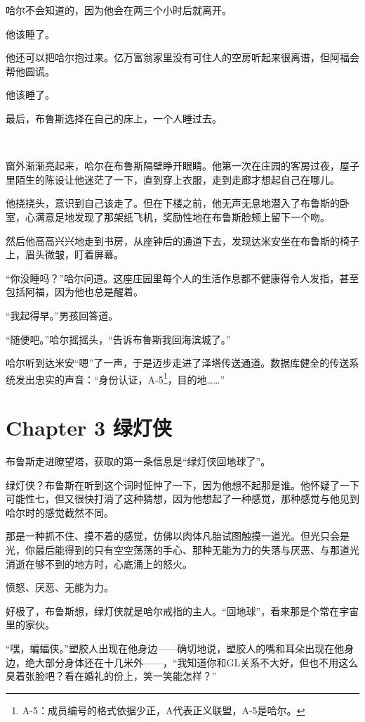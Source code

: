 \documentclass[../main.tex]{subfiles}
\begin{document}
哈尔不会知道的，因为他会在两三个小时后就离开。

他该睡了。

他还可以把哈尔抱过来。亿万富翁家里没有可住人的空房听起来很离谱，但阿福会帮他圆谎。

他该睡了。

最后，布鲁斯选择在自己的床上，一个人睡过去。

~\

窗外渐渐亮起来，哈尔在布鲁斯隔壁睁开眼睛。他第一次在庄园的客房过夜，屋子里陌生的陈设让他迷茫了一下，直到穿上衣服，走到走廊才想起自己在哪儿。

他挠挠头，意识到自己该走了。但在下楼之前，他无声无息地潜入了布鲁斯的卧室，心满意足地发现了那架纸飞机，奖励性地在布鲁斯脸颊上留下一个吻。

然后他高高兴兴地走到书房，从座钟后的通道下去，发现达米安坐在布鲁斯的椅子上，眉头微皱，盯着屏幕。

“你没睡吗？”哈尔问道。这座庄园里每个人的生活作息都不健康得令人发指，甚至包括阿福，因为他也总是醒着。

“我起得早。”男孩回答道。

“随便吧。”哈尔摇摇头，“告诉布鲁斯我回海滨城了。”

哈尔听到达米安“嗯”了一声，于是迈步走进了泽塔传送通道。数据库健全的传送系统发出忠实的声音：“身份认证，A-5\footnote[1]{A-5：成员编号的格式依据少正，A代表正义联盟，A-5是哈尔。}，目的地……”

\section*{Chapter 3\hspace{1em} 绿灯侠}

布鲁斯走进瞭望塔，获取的第一条信息是“绿灯侠回地球了”。

绿灯侠？布鲁斯在听到这个词时怔忡了一下，因为他想不起那是谁。他怀疑了一下可能性七，但又很快打消了这种猜想，因为他想起了一种感觉，那种感觉与他见到哈尔时的感觉截然不同。

那是一种抓不住、摸不着的感觉，仿佛以肉体凡胎试图触摸一道光。但光只会是光，你最后能得到的只有空空荡荡的手心、那种无能为力的失落与厌恶、与那道光消逝在够不到的地方时，心底涌上的怒火。

愤怒、厌恶、无能为力。

好极了，布鲁斯想，绿灯侠就是哈尔戒指的主人。“回地球”，看来那是个常在宇宙里的家伙。

“嘿，蝙蝠侠。”塑胶人出现在他身边——确切地说，塑胶人的嘴和耳朵出现在他身边，绝大部分身体还在十几米外——，“我知道你和GL关系不大好，但也不用这么臭着张脸吧？看在婚礼的份上，笑一笑能怎样？”
\end{document}
